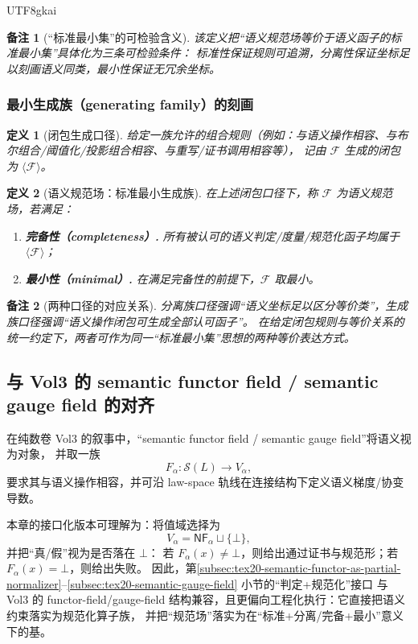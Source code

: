 \documentclass[12pt]{article}
\newtheorem{definition}{定义}[section]
\newtheorem{remark}{备注}[section]
\begin{document}
\begin{CJK*}{UTF8}{gkai}
\begin{remark}[“标准最小集”的可检验含义]
该定义把“语义规范场等价于语义函子的标准最小集”具体化为三条可检验条件：
标准性保证规则可追溯，分离性保证坐标足以刻画语义同类，最小性保证无冗余坐标。
\end{remark}

\subsubsection{最小生成族（generating family）的刻画}
\label{subsubsec:tex20-generating-family}

\begin{definition}[闭包生成口径]
给定一族允许的组合规则（例如：与语义操作相容、与布尔组合/阈值化/投影组合相容、与重写/证书调用相容等），
记由 $\mathcal{F}$ 生成的闭包为 $\langle\mathcal{F}\rangle$。
\end{definition}

\begin{definition}[语义规范场：标准最小生成族]
在上述闭包口径下，称 $\mathcal{F}$ 为语义规范场，若满足：
\begin{enumerate}
  \item \textbf{完备性（completeness）.} 所有被认可的语义判定/度量/规范化函子均属于 $\langle\mathcal{F}\rangle$；
  \item \textbf{最小性（minimal）.} 在满足完备性的前提下，$\mathcal{F}$ 取最小。
\end{enumerate}
\end{definition}

\begin{remark}[两种口径的对应关系]
分离族口径强调“语义坐标足以区分等价类”，生成族口径强调“语义操作闭包可生成全部认可函子”。
在给定闭包规则与等价关系的统一约定下，两者可作为同一“标准最小集”思想的两种等价表达方式。
\end{remark}

\subsection{与 Vol3 的 semantic functor field / semantic gauge field 的对齐}
\label{subsec:tex20-align-with-vol3}

在纯数卷 Vol3 的叙事中，“semantic functor field / semantic gauge field”将语义视为对象，
并取一族
\[
F_\alpha:\mathcal{S}(L)\to V_\alpha,
\]
要求其与语义操作相容，并可沿 law-space 轨线在连接结构下定义语义梯度/协变导数。

本章的接口化版本可理解为：将值域选择为
\[
V_\alpha=\mathsf{NF}_\alpha\sqcup\{\bot\},
\]
并把“真/假”视为是否落在 $\bot$：
若 $F_\alpha(x)\neq \bot$，则给出通过证书与规范形；若 $F_\alpha(x)=\bot$，则给出失败。
因此，第\ref{subsec:tex20-semantic-functor-as-partial-normalizer}--\ref{subsec:tex20-semantic-gauge-field} 小节的“判定+规范化”接口
与 Vol3 的 functor-field/gauge-field 结构兼容，且更偏向工程化执行：它直接把语义约束落实为规范化算子族，
并把“规范场”落实为在“标准+分离/完备+最小”意义下的基。


\end{CJK*}
\end{document}
